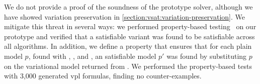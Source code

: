 We do not provide a proof of the soundness of the prototype solver, although we
have showed variation preservation in
\autoref{section:vsat:variation-preservation}. We mitigate this threat in
several ways: we performed property-based testing~\cite{quickcheck} on our
prototype and verified that a satisfiable variant was found to be satisfiable
across all algorithms. In addition, we define a property that ensures that for
each plain model $p$, found with \pTov{}, \vTop{}, and \pTop{}, an satisfiable
model $p'$ was found by substituting $p$ on the variational model returned from
\vsat{}. We performed the property-based tests with 3,000 generated \ac{vpl}
formulas, finding no counter-examples.



